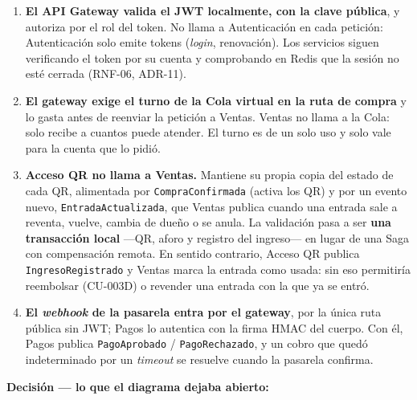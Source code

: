 \begin{enumerate}
  \item \textbf{El API Gateway valida el JWT localmente, con la clave pública},
        y autoriza por el rol del token. No llama a Autenticación en cada
        petición: Autenticación solo emite tokens (\textit{login}, renovación).
        Los servicios siguen verificando el token por su cuenta y comprobando en
        Redis que la sesión no esté cerrada (RNF-06, ADR-11).
  \item \textbf{El gateway exige el turno de la Cola virtual en la ruta de
        compra} y lo gasta antes de reenviar la petición a Ventas. Ventas no
        llama a la Cola: solo recibe a cuantos puede atender. El turno es de un
        solo uso y solo vale para la cuenta que lo pidió.
  \item \textbf{Acceso QR no llama a Ventas.} Mantiene su propia copia del estado
        de cada QR, alimentada por \texttt{CompraConfirmada} (activa los QR) y
        por un evento nuevo, \texttt{EntradaActualizada}, que Ventas publica
        cuando una entrada sale a reventa, vuelve, cambia de dueño o se anula.
        La validación pasa a ser \textbf{una transacción local} ---QR, aforo y
        registro del ingreso--- en lugar de una Saga con compensación remota.
        En sentido contrario, Acceso QR publica \texttt{IngresoRegistrado} y
        Ventas marca la entrada como usada: sin eso permitiría reembolsar
        (CU-003D) o revender una entrada con la que ya se entró.
  \item \textbf{El \textit{webhook} de la pasarela entra por el gateway}, por la
        única ruta pública sin JWT; Pagos lo autentica con la firma HMAC del
        cuerpo. Con él, Pagos publica \texttt{PagoAprobado} /
        \texttt{PagoRechazado}, y un cobro que quedó indeterminado por un
        \textit{timeout} se resuelve cuando la pasarela confirma.
\end{enumerate}

\textbf{Decisión --- lo que el diagrama dejaba abierto:}

